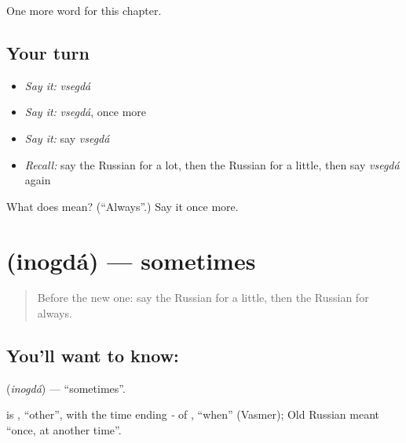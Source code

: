 \begin{grammarlens}[title={What you've built}]
One more word for this chapter.
\end{grammarlens}

\subsection*{Your turn}
\begin{itemize}
\raggedright
  \item \emph{Say it:} \emph{vsegdá}
  \item \emph{Say it:} \emph{vsegdá}, once more
  \item \emph{Say it:} say \emph{vsegdá}
  \item \emph{Recall:} say the Russian for a lot, then the Russian for a little, then say \emph{vsegdá} again
\end{itemize}

\begin{tcolorbox}[breakable,colback=teal!4,colframe=teal!35!black,title={Before you move on}]
What does  mean? (\textquotedblleft{}Always\textquotedblright{}.) Say it once more.
\end{tcolorbox}
\section[\texorpdfstring{\ru{иногда} (inogdá)}{иногда (inogdá)}]{ (inogdá) — sometimes}

\label{lesson:RU-C74-sometimes}



\begin{quote}
Before the new one: say the Russian for a little, then the Russian for always.
\end{quote}

\subsection*{You'll want to know: }
\textbf{} (\emph{inogdá}) — \textquotedblleft{}sometimes\textquotedblright{}.

\begin{cousinweb}
\textbf{} is \emph{}, \textquotedblleft{}other\textquotedblright{}, with the time ending \emph{-} of \emph{}, \textquotedblleft{}when\textquotedblright{} (Vasmer); Old Russian \emph{} meant \textquotedblleft{}once, at another time\textquotedblright{}.
\end{cousinweb}


